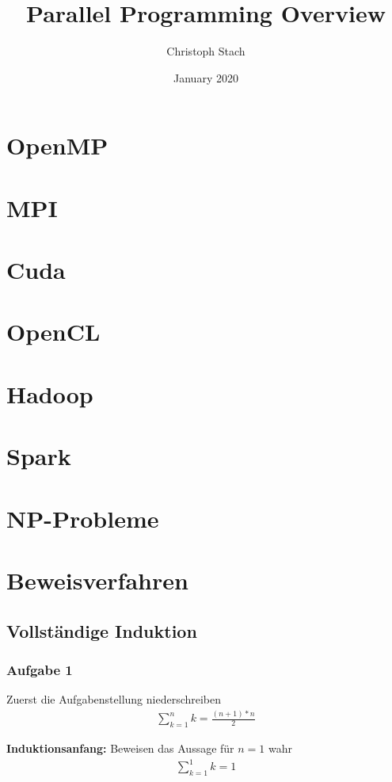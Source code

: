 \documentclass{article}
\title{Parallel Programming Overview}
\author{Christoph Stach}
\date{January 2020}
\begin{document}
\section{OpenMP}

\section{MPI}

\section{Cuda}

\section{OpenCL}

\section{Hadoop}

\section{Spark}

\section{NP-Probleme}

\section{Beweisverfahren}

\subsection{Vollständige Induktion}


\subsubsection{Aufgabe 1}

\noindent Zuerst die Aufgabenstellung niederschreiben
\begin{align*}
    \sum_{k=1}^{n}k = \frac{(n + 1) * n}{2}
\end{align*}


\noindent \textbf{Induktionsanfang:} Beweisen das Aussage für $ n  = 1 $ wahr 
\begin{align*}
    \sum_{k=1}^{1}k = 1
\end{align*}
\end{document}

